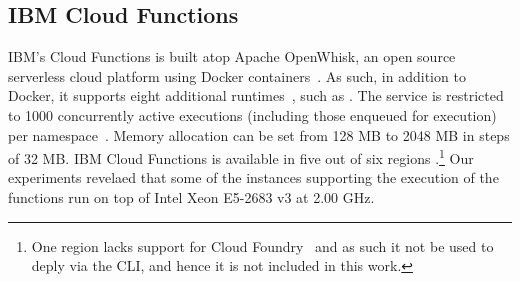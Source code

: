 \begin{table}[!t]

\caption[Google Cloud Functions - Possible memory allocation and corresponding CPU frequency]{Google Cloud Functions - Possible memory allocation and corresponding CPU frequency~\cite{GoogleFunctionsPricing}.}
\centering
{}
\label{table:google_functions_cpu_ram}
\end{table}


\subsection{IBM Cloud Functions}\label{sec:ss:ibm}

\gls{IBM}'s Cloud Functions \cite{IBMFunctions} is built atop Apache OpenWhisk, an open source serverless cloud platform using Docker containers~\cite{OpenWhisk}. 
As such, in addition to Docker, it supports eight additional runtimes~\cite{IBMRuntimes}, such as .
The service is restricted to 1000 concurrently active executions (including those enqueued for execution) per namespace~\cite{IBMLimits}. 
Memory allocation can be set from 128 \gls{MB} to 2048 \gls{MB} in steps of 32 \gls{MB}. 
\gls{IBM} Cloud Functions is available in five out of six regions \cite{IBMLocations}.\footnote{One region lacks support for Cloud Foundry~\cite{IBMCloudFoundry} and as such it not be used to deply via the \gls{CLI}, and hence it is not included in this work.} 
Our experiments revelaed that some of the  instances supporting the execution of the functions run on top of Intel Xeon E5-2683 v3 at 2.00 \gls{GHz}.



